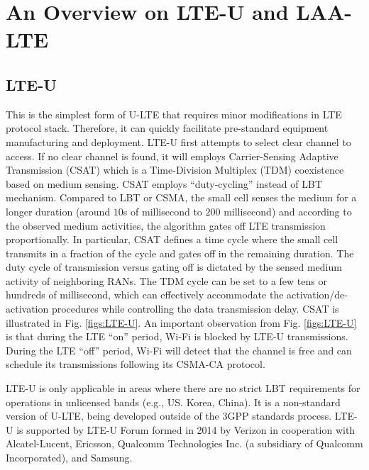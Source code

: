 \documentclass[12pt,onecolumn]{article}
\begin{document}
\section{An Overview on LTE-U and LAA-LTE}
\label{sec:U-LTE-overview}

\subsection{LTE-U}

\noindent This is the simplest form of U-LTE that requires minor modifications in LTE protocol stack. Therefore, it can quickly facilitate pre-standard equipment manufacturing and deployment. LTE-U first attempts to select clear channel to access. If no clear channel is found, it will employs Carrier-Sensing Adaptive Transmission (CSAT) which is a Time-Division Multiplex (TDM) coexistence based on medium sensing. CSAT employs ``duty-cycling'' instead of LBT mechanism. Compared to LBT or CSMA, the small cell senses the medium for a longer duration (around $10$s of millisecond to $200$ millisecond) and according to the observed medium activities, the algorithm gates off LTE transmission proportionally. In particular, CSAT defines a time cycle where the small cell transmits in a fraction of the cycle and gates off in the remaining duration. The duty cycle of transmission versus gating off is dictated by the sensed medium activity of neighboring RANs. The TDM cycle can be set to a few tens or hundreds of millisecond, which can effectively accommodate the activation/de-activation procedures while controlling the data transmission delay. CSAT is illustrated in Fig. \ref{figs:LTE-U}. An important observation from Fig. \ref{figs:LTE-U} is that during the LTE ``on'' period, Wi-Fi is blocked by LTE-U transmissions. During the LTE ``off'' period, Wi-Fi will detect that the channel is free and can schedule its transmissions following its CSMA-CA protocol.

LTE-U is only applicable in areas where there are no strict LBT requirements for operations in unlicensed bands (e.g., US. Korea, China). It is a non-standard version of U-LTE, being developed outside of the 3GPP standards process. LTE-U is supported by LTE-U Forum formed in 2014 by Verizon in cooperation with Alcatel-Lucent, Ericsson, Qualcomm Technologies Inc. (a subsidiary of Qualcomm Incorporated), and Samsung.
\end{document}
